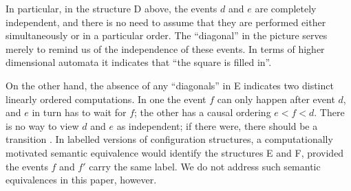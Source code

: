 \documentclass[twocolumn]{article}
\begin{document}
In particular, in the structure D above, the events $d$
and $e$ are completely independent, and there is no need to assume
that they are performed either simultaneously or in a particular
order.  The ``diagonal'' in the picture serves merely to remind us of
the independence of these events.  In terms of higher dimensional
automata \cite{Pr91a} it indicates that ``the square is filled in''.

On the other hand, the absence of any ``diagonals'' in E indicates two
distinct linearly ordered computations. In one the event $f$ can only
happen after event $d$, and $e$ in turn has to wait for $f$; the other
has a causal ordering $e<f<d$. There is no way to view $d$ and $e$ as
independent; if there were, there should be a transition
.  In labelled versions of
configuration structures, a computationally motivated semantic
equivalence would identify the structures E and F, provided the events
$f$ and $f'$ carry the same label. We do not address such semantic
equivalences in this paper, however.
\end{document}
